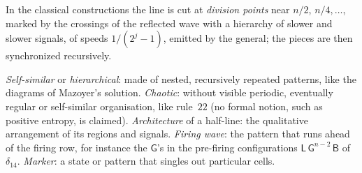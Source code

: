 {\begin{description}[style=unboxed,leftmargin=1em,font=\normalfont\bfseries,itemsep=1pt,parsep=0pt,topsep=2pt]
\item[Division points; hierarchy of signals.] In the classical
  constructions the line is cut at \emph{division points} near $n/2$,
  $n/4,\dots$, marked by the crossings of the reflected wave with a
  hierarchy of slower and slower signals, of speeds $1/(2^j-1)$, emitted
  by the general; the pieces are then synchronized recursively.
\item[Descriptive words.] \emph{Self-similar} or \emph{hierarchical}: made
  of nested, recursively repeated patterns, like the diagrams of Mazoyer's
  solution. \emph{Chaotic}: without visible periodic, eventually regular or
  self-similar organisation, like rule~$22$ (no formal notion, such as
  positive entropy, is claimed). \emph{Architecture} of a half-line: the
  qualitative arrangement of its regions and signals. \emph{Firing wave}:
  the pattern that runs ahead of the firing row, for instance the
  $\mathsf G$'s in the pre-firing configurations $\mathsf L\,\mathsf
  G^{n-2}\,\mathsf B$ of $\delta_{14}$. \emph{Marker}: a state or pattern
  that singles out particular cells.
\end{description}

}
